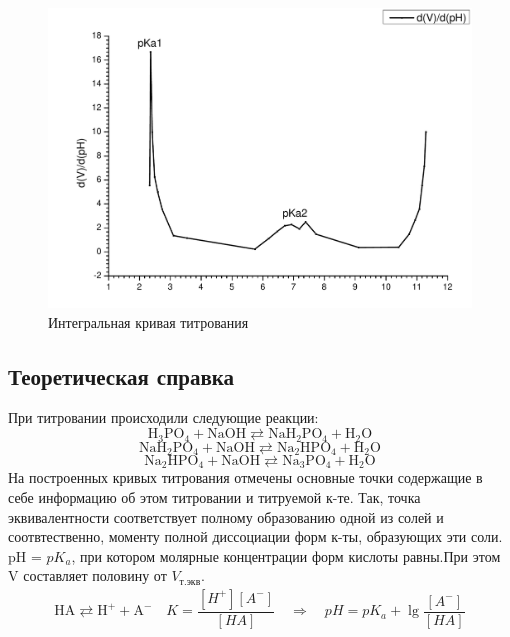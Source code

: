 \documentclass[a4paper,12pt]{article}
\begin{document}
\begin{figure}[h]

\centering

\includegraphics[scale=0.5]{integral.pdf}

\caption{Интегральная кривая титрования}

\label{fig:mpr}
\end{figure} 


\subsection{Теоретическая справка}
При титровании происходили следующие реакции:
\begin{equation}
\mathrm{H_3PO_4 + NaOH \rightleftarrows NaH_2PO_4 + H_2O}
\end{equation}
\begin{equation}
\mathrm{NaH_2PO_4 + NaOH \rightleftarrows Na_2HPO_4 + H_2O}
\end{equation}
\begin{equation}
\mathrm{Na_2HPO_4 + NaOH \rightleftarrows Na_3PO_4 + H_2O}
\end{equation}
На построенных кривых титрования отмечены основные точки содержащие в себе информацию об этом титровании и титруемой к-те. Так, точка эквивалентности соответствует полному образованию одной из солей и соотвтественно, моменту полной диссоциации форм к-ты, образующих эти соли. pH = $pK_{a}$, при котором молярные концентрации форм кислоты равны.При этом V составляет половину от $V_{т.экв}$.
\begin{gather}
\mathrm{HA \rightleftarrows H^+ + A^-} \quad K = \dfrac{[H^+][A^-]}{[HA]} \quad \Rightarrow \quad pH = pK_{a} + \lg \dfrac{[A^-]}{[HA]}
\end{gather}
\end{document}
